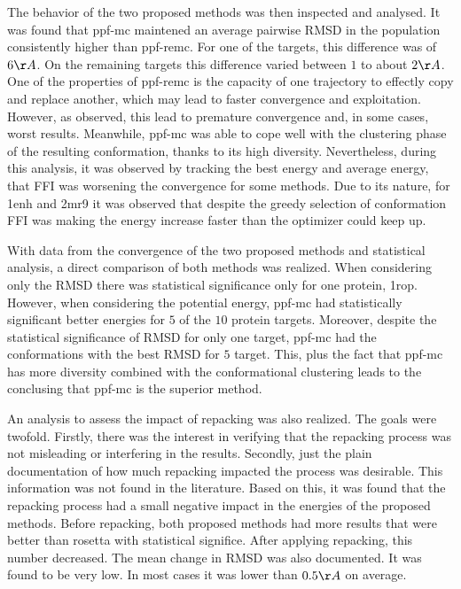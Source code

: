 The behavior of the two proposed methods was then inspected and analysed. It was
found that ppf-mc maintened an average pairwise RMSD in the population
consistently higher than ppf-remc. For one of the targets, this difference was
of $6\AA$. On the remaining targets this difference varied between $1$ to about
$2\AA$. One of the properties of ppf-remc is the capacity of one trajectory to
effectly copy and replace another, which may lead to faster convergence and
exploitation. However, as observed, this lead to premature convergence and, in
some cases, worst results. Meanwhile, ppf-mc was able to cope well with the
clustering phase of the resulting conformation, thanks to its high diversity.
Nevertheless, during this analysis, it was observed by tracking the best energy
and average energy, that FFI was worsening the convergence for some methods.
Due to its nature, for 1enh and 2mr9 it was observed that despite the greedy
selection of conformation FFI was making the energy increase faster than the
optimizer could keep up.

With data from the convergence of the two proposed methods and statistical
analysis, a direct comparison of both methods was realized. When considering
only the RMSD there was statistical significance only for one protein, 1rop.
However, when considering the potential energy, ppf-mc had statistically
significant better energies for $5$ of the $10$ protein targets. Moreover,
despite the statistical significance of RMSD for only one target, ppf-mc had
the conformations with the best RMSD for $5$ target. This, plus the fact that
ppf-mc has more diversity combined with the conformational clustering leads to
the conclusing that ppf-mc is the superior method.

An analysis to assess the impact of repacking was also realized. The goals were
twofold. Firstly, there was the interest in verifying that the repacking process
was not misleading or interfering in the results. Secondly, just the plain
documentation of how much repacking impacted the process was desirable. This
information was not found in the literature. Based on this, it was found that
the repacking process had a small negative impact in the energies of the
proposed methods. Before repacking, both proposed methods had more results that
were better than rosetta with statistical significe. After applying repacking,
this number decreased. The mean change in RMSD was also documented. It was found
to be very low. In most cases it was lower than $0.5\AA$ on average.

